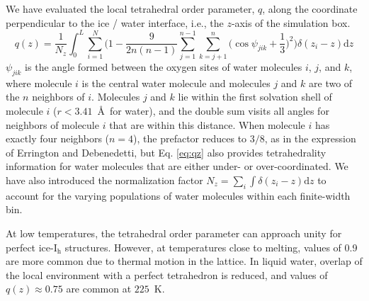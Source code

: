 \documentclass[journal = jpccck, manuscript = article]{achemso}
\begin{document}
We have evaluated the local tetrahedral order parameter, $q$, along
the coordinate perpendicular to the ice / water interface, i.e., the
$z$-axis of the simulation box.
\begin{equation}
q(z) = \frac{1}{N_z} \int_0^L \sum_{i=1}^{N} \Bigg(1 -\frac{9}{2n(n-1)}\sum_{j=1}^{n-1}
\sum_{k=j+1}^{n} \bigg(\cos\psi_{jik}+\frac{1}{3}\bigg)^2\Bigg)
\delta(z_{i}-z)\mathrm{d}z 
\label{eq:qz}
\end{equation}
$\psi_{jik}$ is the angle formed between the oxygen sites of water
molecules $i$, $j$, and $k$, where molecule $i$ is the central water
molecule and molecules $j$ and $k$ are two of the $n$ neighbors of
$i$.  Molecules $j$ and $k$ lie within the first solvation shell of
molecule $i$ ($r < 3.41$~\AA\ for water), and the double sum visits
all angles for neighbors of molecule $i$ that are within this
distance.  When molecule $i$ has exactly four neighbors ($n=4$), the
prefactor reduces to $3/8$, as in the expression of Errington and
Debenedetti, but Eq. \eqref{eq:qz} also provides tetrahedrality
information for water molecules that are either under- or
over-coordinated. We have also introduced the normalization factor
$N_z = \sum_i \int \delta(z_i - z) \mathrm{d}z$ to account for the
varying populations of water molecules within each finite-width bin.

At low temperatures, the tetrahedral order parameter can approach
unity for perfect ice-I$_\mathrm{h}$ structures. However, at
temperatures close to melting, values of 0.9 are more common due to
thermal motion in the lattice. In liquid water, overlap of the local
environment with a perfect tetrahedron is reduced, and values of
$q(z) \approx 0.75$ are common at $225$~K.
\end{document}
